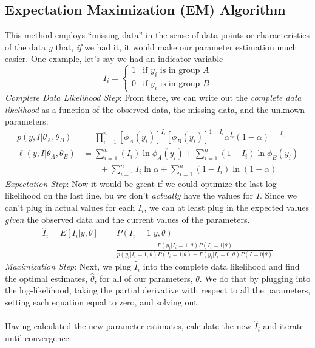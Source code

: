 \documentclass[12pt]{article}
\begin{document}
\subsection{Expectation Maximization (EM) Algorithm}

This method employs ``missing data'' in the sense of data points
or characteristics of the data $y$ that, \emph{if} we had it, it
would make our parameter estimation much easier. One example, 
let's say we had an indicator variable
\[ I_i = \begin{cases} 1 & \text{if $y_i$ is in group $A$} \\
      0 & \text{if $y_i$ is in group $B$} \end{cases} \]
      {\sl Complete Data Likelihood Step}:
From there, we can write out the \emph{complete data likelihood}
as a function of the observed data, the missing data, and the unknown
parameters:
\begin{align*}
    p(y, I | \theta_A, \theta_B) &= \prod^n_{i=1}
      \left[  \phi_A(y_i)\right]^{I_i} 
      \left[\phi_B(y_i) \right]^{1-I_i} \alpha^{I_i}(1-\alpha)^{1-I_i}
      \\
   \ell(y,I|\theta_A, \theta_B) &= \sum^n_{i=1} (I_i) \ln \phi_A(y_i)
   + \sum^n_{i=1} (1-I_i) \ln \phi_B(y_i)  \\
   &\qquad +
   \sum^n_{i=1} I_i \ln \alpha +\sum^n_{i=1} (1-I_i) \ln (1-\alpha)
\end{align*}
{\sl Expectation Step}: 
Now it would be great if we could optimize the last log-likelihood
on the last line, bu we don't \emph{actually} have the values for
$I$. Since we can't plug in actual values for
each $I_i$, we can at least plug in the expected values \emph{given}
the observed data and the current values of the parameters.
\begin{align*}
   \hat{I}_i = E[I_i | y, \theta] &= P(I_i=1 | y, \theta)\\
   &= \frac{ P(y_i | I_i = 1, \theta) P(I_i=1 | \theta)}{
      p(y_i|I_i = 1, \theta) P(I_i=1 |\theta) + 
      P(y_i|I_i=0, \theta) P(I=0|\theta)}
\end{align*}
{\sl Maximization Step}: Next, we plug $\hat{I}_i$ into the complete
data likelihood and find the optimal estimates, $\hat{\theta}$,
for all of our parameters, $\theta$. We do that by plugging into
the log-likelihood, taking the partial derivative with respect to all
the parameters, setting each equation equal to zero, and solving out.
\\
\\
Having calculated the new parameter estimates, calculate the new
$\hat{I}_i$ and iterate until convergence.
\end{document}
